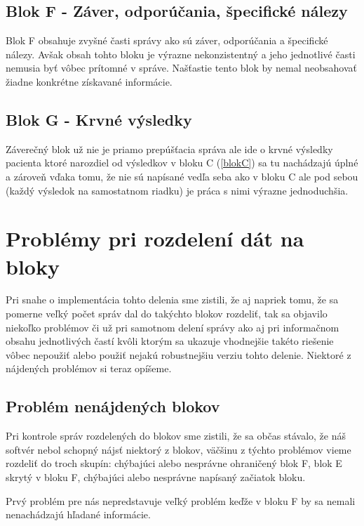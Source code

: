 \subsection{Blok F - Záver, odporúčania, špecifické nálezy}

Blok F obsahuje zvyšné časti správy ako sú záver, odporúčania a špecifické nálezy. Avšak obsah tohto bloku je výrazne nekonzistentný a jeho jednotlivé časti nemusia byť vôbec prítomné v správe. Našťastie tento blok by nemal neobsahovať žiadne konkrétne získavané informácie.

\subsection{Blok G - Krvné výsledky}
\label{blokG}
Záverečný blok už nie je priamo prepúšťacia správa ale ide o krvné výsledky pacienta ktoré narozdiel od výsledkov v bloku C (\ref{blokC}) sa tu nachádzajú úplné a zároveň vďaka tomu, že nie sú napísané vedľa seba ako v bloku C ale pod sebou (každý výsledok na samostatnom riadku) je práca s nimi výrazne jednoduchšia.

\section{Problémy pri rozdelení dát na bloky} 

Pri snahe o implementácia tohto delenia sme zistili, že aj napriek tomu, že sa pomerne veľký počet správ dal do takýchto blokov rozdeliť, tak sa objavilo niekoľko problémov či už pri samotnom delení správy ako aj pri informačnom obsahu jednotlivých častí kvôli ktorým sa ukazuje vhodnejšie takéto riešenie vôbec nepoužiť alebo použiť nejakú robustnejšiu verziu tohto delenie. Niektoré z nájdených problémov si teraz opíšeme.

\subsection{Problém nenájdených blokov}

Pri kontrole správ rozdelených do blokov sme zistili, že sa občas stávalo, že náš softvér nebol schopný nájsť niektorý z blokov, väčšinu z týchto problémov vieme rozdeliť do troch skupín: chýbajúci alebo nesprávne ohraničený blok F, blok E skrytý v bloku F, chýbajúci alebo nesprávne napísaný začiatok bloku.

Prvý problém pre nás nepredstavuje veľký problém keďže v bloku F by sa nemali nenachádzajú hľadané informácie. 

